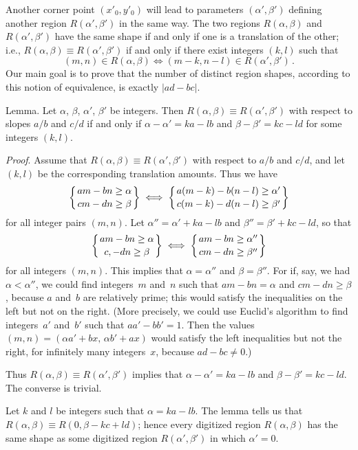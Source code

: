 Another corner point $(x'_0,y'_0)$ will lead to parameters
$(\alpha',\beta')$ defining another region $R(\alpha',\beta')$ in the
same way. The two regions $R(\alpha,\beta)$ and $R(\alpha',\beta')$
have the same shape if and only if one is a translation of the other; i.e.,
$R(\alpha,\beta)\equiv R(\alpha',\beta')$ if and only if there exist
integers $(k,l)$ such that
$$(m,n)\in R(\alpha,\beta)\Longleftrightarrow (m-k,n-l)\in
R(\alpha',\beta')\,.$$
Our main goal is to prove that the number of distinct region shapes,
according to this notion of equivalence, is exactly $\vert ad-bc\vert$.

\proclaim Lemma. Let $\alpha$, $\beta$, $\alpha'$, $\beta'$ be
integers. Then $R(\alpha,\beta)\equiv R(\alpha',\beta')$ with respect
to slopes $a/b$ and $c/d$ if and only if $\alpha-\alpha'=ka-lb$ and
$\beta-\beta'=kc-ld$ for some integers $(k,l)$.

\noindent
{\it Proof}.
Assume that $R(\alpha,\beta)\equiv R(\alpha',\beta')$ with respect to
$a/b$ and $c/d$, and let $(k,l)$ be the corresponding translation
amounts. Thus we have
$$\left\{{am-bn\geq\alpha\atop cm-dn\geq\beta}\right\}\;\Longleftrightarrow \;
\left\{{a(m-k)-b(n-l)\geq\alpha'\atop 
c(m-k)-d(n-l)\geq\beta'}\right\}$$
for all integer pairs $(m,n)$. 
Let $\alpha''=\alpha'+ka-lb$ and $\beta''=\beta'+kc-ld$, so that
$$\left\{{am-bn\geq\alpha\atop c,-dn\geq\beta}\right\}
\;\Longleftrightarrow \;
\left\{{am-bn\geq\alpha''\atop
cm-dn\geq\beta''}\right\}$$
for all integers $(m,n)$. This implies that $\alpha=\alpha''$ and
$\beta=\beta''$. For if, say, we had $\alpha<\alpha''$, we could find
integers~$m$ and~$n$ such that $am-bn=\alpha$ and $cm-dn\geq\beta$,
because $a$ and~$b$ are relatively prime; this would satisfy the
inequalities on the left but not on the right. (More precisely, we
could use Euclid's algorithm to find integers~$a'$ and~$b'$ such that
$aa'-bb'=1$. Then the values $(m,n)=(\alpha a'+bx,\,\alpha b'+ax)$
would satisfy the left inequalities but not the right, for infinitely
many integers~$x$, because $ad-bc\neq 0$.)

Thus $R(\alpha,\beta)\equiv R(\alpha',\beta')$ implies that
$\alpha-\alpha'=ka-lb$ and $\beta-\beta'=kc-ld$. The converse is
trivial.\quad\pfbox

\medskip
Let $k$ and $l$ be integers such that $\alpha=ka-lb$. The lemma tells
us that $R(\alpha,\beta)\equiv R(0,\beta-kc+ld)$; hence every
digitized region $R(\alpha,\beta)$ has the same shape as some
digitized region $R(\alpha',\beta')$ in which $\alpha'=0$.

